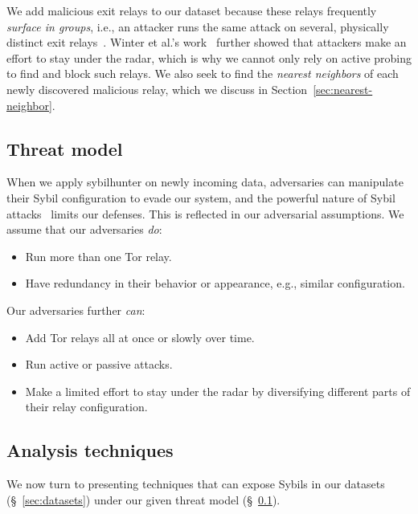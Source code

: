 We add malicious exit relays to our dataset because these relays frequently
\emph{surface in groups}, i.e., an attacker runs the same attack on several,
physically distinct exit relays~\cite{Winter2014a}.  Winter et al.'s
work~\cite[\S 5.2]{Winter2014a} further showed that attackers make an effort to
stay under the radar, which is why we cannot only rely on active probing to find
and block such relays.  We also seek to find the \emph{nearest neighbors} of
each newly discovered malicious relay, which we discuss in
Section~\ref{sec:nearest-neighbor}.

\subsection{Threat model}
\label{sec:threat_model}
When we apply sybilhunter on newly incoming data, adversaries can manipulate
their Sybil configuration to evade our system, and the powerful nature of Sybil
attacks~\cite{Douceur2002a} limits our defenses.  This is reflected in our
adversarial assumptions.  We assume that our adversaries \emph{do}:
\begin{itemize}
	\item Run more than one Tor relay.

	\item Have redundancy in their behavior or appearance, e.g., similar
		configuration.
\end{itemize}

Our adversaries further \emph{can}:
\begin{itemize}
	\item Add Tor relays all at once or slowly over time.

	\item Run active or passive attacks.

	\item Make a limited effort to stay under the radar by diversifying
		different parts of their relay configuration.
\end{itemize}


\subsection{Analysis techniques}
\label{sec:techniques}
We now turn to presenting techniques that can expose Sybils in our datasets
(\S~\ref{sec:datasets}) under our given threat model
(\S~\ref{sec:threat_model}).

